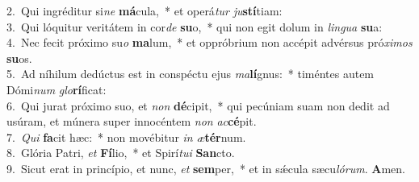 {2.~}Qui ingréditur si\textit{ne} \textbf{má}cula,~* et operá\textit{tur} \textit{ju}\textbf{stí}tiam:\\
{3.~}Qui lóquitur veritátem in cor\textit{de} \textbf{su}o,~* qui non egit dolum in \textit{lin}\textit{gua} \textbf{su}a:\\
{4.~}Nec fecit próximo su\textit{o} \textbf{ma}lum,~* et oppróbrium non accépit advérsus pró\textit{xi}\textit{mos} \textbf{su}os.\\
{5.~}Ad níhilum dedúctus est in conspéctu ejus \textit{ma}\textbf{lí}gnus:~* timéntes autem Dómi\textit{num} \textit{glo}\textbf{rí}ficat:\\
{6.~}Qui jurat próximo suo, et \textit{non} \textbf{dé}cipit,~* qui pecúniam suam non dedit ad usúram, et múnera super innocéntem \textit{non} \textit{ac}\textbf{cé}pit.\\
{7.~}\textit{Qui} \textbf{fa}cit hæc:~* non movébitur \textit{in} \textit{æ}\textbf{tér}num.\\
{8.~}Glória Patri, \textit{et} \textbf{Fí}lio,~* et Spirí\textit{tu}\textit{i} \textbf{San}cto.\\
{9.~}Sicut erat in princípio, et nunc, \textit{et} \textbf{sem}per,~* et in sǽcula sæcu\textit{ló}\textit{rum}. \textbf{A}men.\\
